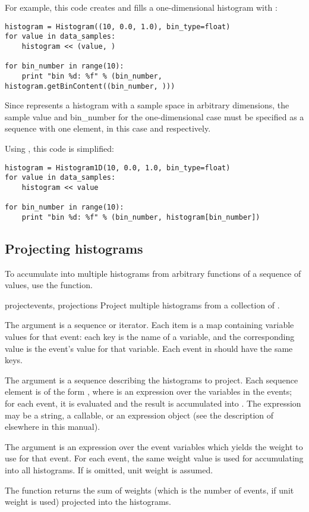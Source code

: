 For example, this code creates and fills a one-dimensional histogram
with :
\begin{verbatim}
histogram = Histogram((10, 0.0, 1.0), bin_type=float)
for value in data_samples:
    histogram << (value, )

for bin_number in range(10):
    print "bin %d: %f" % (bin_number, histogram.getBinContent((bin_number, )))
\end{verbatim}
Since  represents a histogram with a sample space in
arbitrary dimensions, the sample value and bin_number for the
one-dimensional case must be specified as a sequence with one element,
in this case  and  respectively.

Using , this code is simplified:
\begin{verbatim}
histogram = Histogram1D(10, 0.0, 1.0, bin_type=float)
for value in data_samples:
    histogram << value

for bin_number in range(10):
    print "bin %d: %f" % (bin_number, histogram[bin_number])
\end{verbatim}


\subsection{Projecting histograms}

To accumulate into multiple histograms from arbitrary functions of a
sequence of values, use the  function.

\begin{funcdesc}{project}{events, projections}
 Project multiple histograms from a collection of .

 The  argument is a sequence or iterator.  Each item is a
 map containing variable values for that event: each key is the name of
 a variable, and the corresponding value is the event's value for that
 variable.  Each event in  should have the same keys.

 The  argument is a sequence describing the histograms
 to project.  Each sequence element is of the form , where  is an expression over the variables
 in the events; for each event, it is evaluated and the result is
 accumulated into .  The expression may be a string, a
 callable, or an expression object (see the description of
  elsewhere in this manual).  

 The  argument is an expression over the event variables
 which yields the weight to use for that event.  For each event, the
 same weight value is used for accumulating into all histograms.  If
  is omitted, unit weight is assumed.

 The function returns the sum of weights (which is the number of events,
 if unit weight is used) projected into the histograms.
\end{funcdesc}

